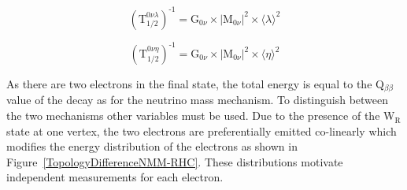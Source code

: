 \documentclass[main.tex]{subfiles}
\begin{document}
\begin{equation}
(\text{T}_{\text{1/2}}^{\text{0}\nu\lambda})^{\text{-1}} = \text{G}_{\text{0}\nu} \times |\text{M}_{\text{0}\nu}|^\text{2} \times \langle \lambda \rangle^\text{2}
\end{equation}

\begin{equation}
(\text{T}_{\text{1/2}}^{\text{0}\nu\eta})^{\text{-1}} = \text{G}_{\text{0}\nu} \times |\text{M}_{\text{0}\nu}|^\text{2} \times \langle \eta \rangle^\text{2}
\end{equation}


\bigskip


\NI As there are two electrons in the final state, the total energy is equal to the Q$_{\beta\beta}$ value of the decay as for the neutrino mass mechanism. To distinguish between the two mechanisms other variables must be used. Due to the presence of the W$_\text{R}$ state at one vertex, the two electrons are preferentially emitted co-linearly which modifies the energy distribution of the electrons as shown in Figure~\ref{TopologyDifferenceNMM-RHC}. These distributions motivate independent measurements for each electron.
\end{document}
